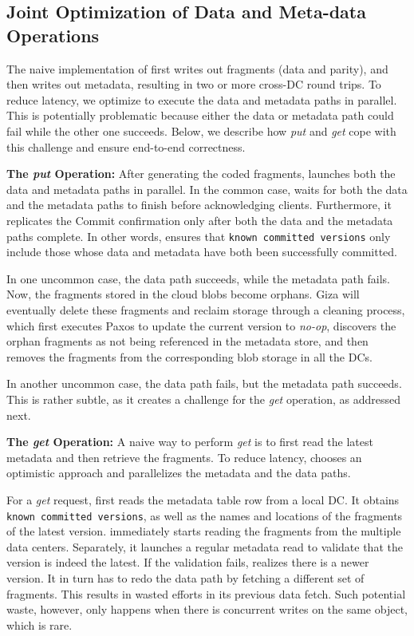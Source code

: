 \subsection{Joint Optimization of Data and Meta-data Operations}

The naive implementation of \name first writes out fragments (data and parity), 
and then writes out metadata, resulting in two or more cross-DC round trips. To
reduce latency, we optimize \name to execute the data and metadata paths in
parallel. This is potentially problematic because either the data or metadata
path could fail while the other one succeeds. Below, we describe how {\em put}
and {\em get} cope with this challenge and ensure end-to-end correctness.

{\bf The \emph{put} Operation:} After generating the coded fragments,
\name launches both the data and metadata paths in parallel.
In the common case, \name waits for both the data and the
metadata paths to finish before acknowledging clients. Furthermore, it
replicates the Commit confirmation only after both the data and the metadata
paths complete. In other words, \name ensures that {\tt known committed versions}
only include those whose data and metadata have both been successfully committed.

In one uncommon case, the data path succeeds, while the metadata path fails.
Now, the fragments stored in the cloud blobs become orphans.
Giza will eventually delete these fragments and reclaim storage through a cleaning process,
which first executes Paxos to update the current version to {\em no-op},
discovers the orphan fragments as not being referenced in the metadata store, 
and then removes the fragments from the corresponding blob storage in all the DCs.

In another uncommon case, the data path fails, but the metadata path succeeds.
This is rather subtle, as it creates a challenge for the {\em get} operation,
as addressed next.

{\bf The \emph{get} Operation:}
A naive way to perform {\em get} is to first read the latest metadata and then retrieve the fragments.
To reduce latency, {\name} chooses an optimistic approach and parallelizes the metadata and the data paths.

For a {\em get} request, {\name} first reads the metadata table row from a local DC.
It obtains {\tt known committed versions}, 
as well as the names and locations of the fragments of the latest version.
\name immediately starts reading the fragments from the multiple data centers.
Separately, it launches a regular metadata read to validate that the version is indeed the latest.
If the validation fails, \name realizes there is a newer version.
It in turn has to redo the data path by fetching a different set of fragments.
This results in wasted efforts in its previous data fetch.
Such potential waste, however, only happens when there is concurrent writes on the same object,
which is rare.

